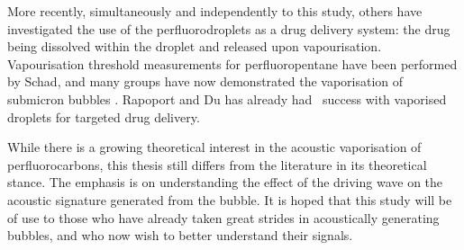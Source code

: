 More recently, simultaneously and independently to this study,
others have investigated the use of the perfluorodroplets as a drug delivery system:
the drug being dissolved within the droplet and released upon vapourisation\cite{Fabiilli2010}.
Vapourisation threshold measurements for perfluoropentane have been performed by Schad\cite{Schad2009},
and many groups have now demonstrated the vaporisation of submicron bubbles\cite{Burns2010,Sheeran2013,Rapoport2010,Lin2013} .
Rapoport and Du \cite{Rapoport2007,Du2011} has already had \invivo\ success with vaporised droplets for targeted drug delivery.



While there is a growing theoretical interest in the acoustic vaporisation of perfluorocarbons\cite{Sheeran2013,Doinikov2014,Shpak2013},
this thesis still differs from the literature in its theoretical stance.
The emphasis is on understanding the effect of the driving wave 
on the acoustic signature generated from the bubble.
It is hoped that this study will be of use 
to those who have already taken great strides in acoustically generating bubbles,
and who now wish to better understand their signals.














